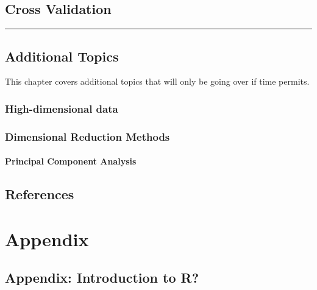 \documentclass[
  letterpaper,
  DIV=11,
  numbers=noendperiod]{scrreprt}
\begin{document}

\chapter{Cross Validation}\label{cross-validation}

\begin{center}\rule{0.5\linewidth}{0.5pt}\end{center}


\chapter{Additional Topics}\label{additional-topics}

This chapter covers additional topics that will only be going over if
time permits.

\section{High-dimensional data}\label{high-dimensional-data}

\section{Dimensional Reduction
Methods}\label{dimensional-reduction-methods}

\subsection{Principal Component
Analysis}\label{principal-component-analysis}


\chapter*{References}\label{references}


\label{refs}

\part{Appendix}

\chapter{Appendix: Introduction to R?}\label{appendix-introduction-to-r}
\end{document}
